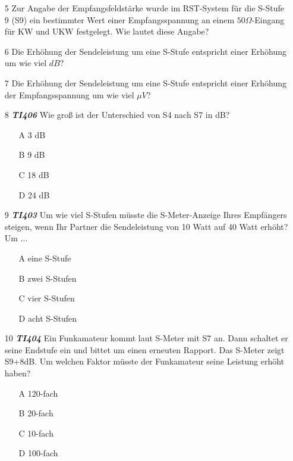 \begin{enumerate} 
\itemsep1pt\parskip0pt
\item[5] Zur Angabe der Empfangsfeldstärke wurde im RST-System für die S-Stufe $9$ (S9) ein bestimmter Wert einer Empfangsspannung an einem $50\Omega$-Eingang für KW und UKW festgelegt. Wie lautet diese Angabe?
\item[6] Die Erhöhung der Sendeleistung um eine S-Stufe entspricht einer Erhöhung um wie viel $dB$?
\item[7] Die Erhöhung der Sendeleistung um eine S-Stufe entspricht einer Erhöhung der Empfangsspannung um wie viel $\mu V$? 
\item[8] \emph{\textbf{TI406}} Wie groß ist der Unterschied von S4 nach S7 in dB?
	\begin{enumerate}
	\itemsep1pt\parskip0pt
		\item[A] 3 dB
		\item[B] 9 dB
		\item[C] 18 dB
		\item[D] 24 dB
	\end{enumerate}
\item[9] \emph{\textbf{TI403}} Um wie viel S-Stufen müsste die S-Meter-Anzeige Ihres Empfängers steigen, wenn Ihr Partner die Sendeleistung von 10 Watt auf 40 Watt erhöht? Um ...
	\begin{enumerate}
	\itemsep1pt\parskip0pt
		\item[A] eine S-Stufe
		\item[B] zwei S-Stufen
		\item[C] vier S-Stufen
		\item[D] acht S-Stufen
	\end{enumerate}
\item[10] \emph{\textbf{TI404}} Ein Funkamateur kommt laut S-Meter mit S7 an. Dann schaltet er seine Endstufe ein und bittet um einen erneuten Rapport. Das S-Meter zeigt S9+8dB. Um welchen Faktor müsste der Funkamateur seine Leistung erhöht haben?
	\begin{enumerate}
	\itemsep1pt\parskip0pt
		\item[A] 120-fach
		\item[B] 20-fach 
		\item[C] 10-fach
		\item[D] 100-fach
	\end{enumerate}
\end{enumerate}

